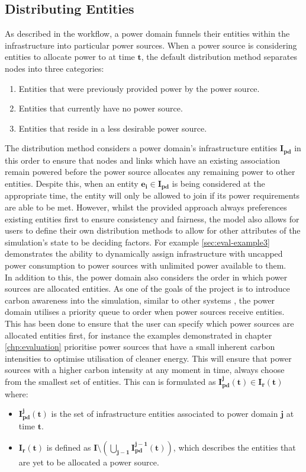 \documentclass{l4proj}
\begin{document}
\subsection{Distributing Entities}\label{subsec:distributing-entities}
As described in the workflow, a power domain funnels their entities within the infrastructure into particular power sources.
When a power source is considering entities to allocate power to at time $\mathbf{t}$, the default distribution method separates nodes into three categories:
\begin{enumerate}
    \item Entities that were previously provided power by the power source.
    \item Entities that currently have no power source.
    \item Entities that reside in a less desirable power source.
\end{enumerate}

The distribution method considers a power domain's infrastructure entities $\mathbf{I_{pd}}$ in this order to ensure that nodes and links which have an existing association remain powered before the power source allocates any remaining power to other entities.
Despite this, when an entity $\mathbf{e_{i} \in I_{pd}}$ is being considered at the appropriate time, the entity will only be allowed to join if its power requirements are able to be met.
However, whilst the provided approach always preferences existing entities first to ensure consistency and fairness, the model also allows for users to define their own distribution methods to allow for other attributes of the simulation's state to be deciding factors.
For example \ref{sec:eval-example3} demonstrates the ability to dynamically assign infrastructure with uncapped power consumption to power sources with unlimited power available to them.\\

In addition to this, the power domain also considers the order in which power sources are allocated entities.
As one of the goals of the project is to introduce carbon awareness into the simulation, similar to other systems \cite{cucumber}, the power domain utilises a priority queue to order when power sources receive entities.
This has been done to ensure that the user can specify which power sources are allocated entities first, for instance the examples demonstrated in chapter \ref{chp:evaluation} prioritise power sources that have a small inherent carbon intensities to optimise utilisation of cleaner energy.
This will ensure that power sources with a higher carbon intensity at any moment in time, always choose from the smallest set of entities.
This can is formulated as $\mathbf{I_{pd}^j(t) \in I_{r}(t)}$ where:
\begin{itemize}
    \item $\mathbf{I_{pd}^j(t)}$ is the set of infrastructure entities associated to power domain $\mathbf{j}$ at time $\mathbf{t}$.\\
    \item $\mathbf{I_{r}(t)}$ is defined as $\mathbf{I \setminus \left( \bigcup_{j-1} I_{pd}^{j-1}(t) \right)}$, which describes the entities that are yet to be allocated a power source.
\end{itemize}
\end{document}
